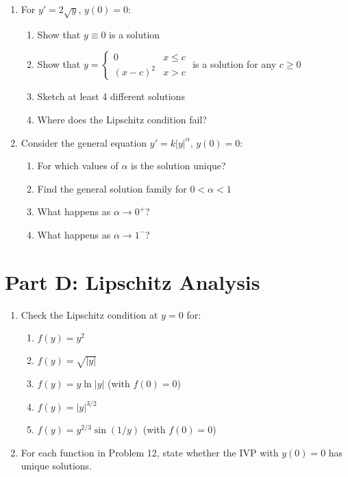 \documentclass[12pt]{article}
\begin{document}
\begin{enumerate}[start=10]
    \item For $y' = 2\sqrt{y}$, $y(0) = 0$:
    \begin{enumerate}[label=(\alph*)]
        \item Show that $y \equiv 0$ is a solution
        \item Show that $y = \begin{cases} 0 & x \leq c \\ (x-c)^2 & x > c \end{cases}$ is a solution for any $c \geq 0$
        \item Sketch at least 4 different solutions
        \item Where does the Lipschitz condition fail?
    \end{enumerate}
    
    \item Consider the general equation $y' = k|y|^\alpha$, $y(0) = 0$:
    \begin{enumerate}[label=(\alph*)]
        \item For which values of $\alpha$ is the solution unique?
        \item Find the general solution family for $0 < \alpha < 1$
        \item What happens as $\alpha \to 0^+$?
        \item What happens as $\alpha \to 1^-$?
    \end{enumerate}
\end{enumerate}

\section*{Part D: Lipschitz Analysis}

\begin{enumerate}[start=12]
    \item Check the Lipschitz condition at $y = 0$ for:
    \begin{enumerate}[label=(\alph*)]
        \item $f(y) = y^2$
        \item $f(y) = \sqrt{|y|}$
        \item $f(y) = y\ln|y|$ (with $f(0) = 0$)
        \item $f(y) = |y|^{3/2}$
        \item $f(y) = y^{2/3}\sin(1/y)$ (with $f(0) = 0$)
    \end{enumerate}
    
    \item For each function in Problem 12, state whether the IVP with $y(0) = 0$ has unique solutions.
\end{enumerate}
\end{document}
